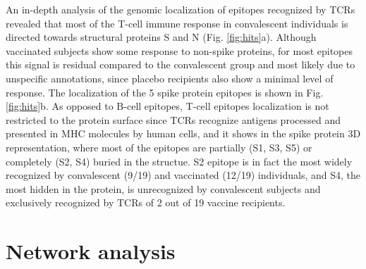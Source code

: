 An in-depth analysis of the genomic localization of \covid{} epitopes recognized by TCRs revealed that most of the T-cell immune response in convalescent individuals is directed towards structural proteins S and N (Fig. \ref{fig:hits}a). Although vaccinated subjects show some response to non-spike proteins, for most epitopes this signal is residual compared to the convalescent group and most likely due to unspecific annotations, since placebo recipients also show a minimal level of response. The localization of the 5 spike protein epitopes is shown in Fig. \ref{fig:hits}b. As opposed to B-cell epitopes, T-cell epitopes localization is not restricted to the protein surface since TCRs recognize antigens processed and presented in MHC molecules by human cells, and it shows in the spike protein 3D representation, where most of the epitopes are partially (S1, S3, S5) or completely (S2, S4) buried in the structue. S2 epitope is in fact the most widely recognized by convalescent (9/19) and vaccinated (12/19) individuals, and S4, the most hidden in the protein, is unrecognized by convalescent subjects and exclusively recognized by TCRs of 2 out of 19 vaccine recipients.




\section*{Network analysis}

